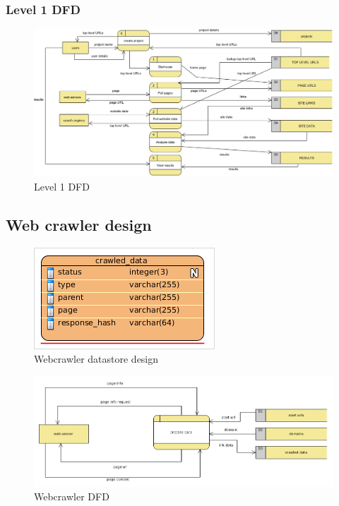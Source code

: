 \subsubsection{Level 1 DFD}
\begin{figure}[H]
	\includegraphics[width=\linewidth,scale=0.5]{../static/img/level_1_dfd.png}
	\caption{Level 1 DFD}
\end{figure}

\subsection{Web crawler design}
\begin{figure}[H]
	\includegraphics[width=\linewidth,scale=0.5]{../static/img/crawler_datastore.png}
	\caption{Webcrawler datastore design}
\end{figure}
\begin{figure}[H]
	\includegraphics[width=\linewidth,scale=0.5]{../static/img/crawler_level1_dfd.png}
	\caption{Webcrawler DFD}
\end{figure}

